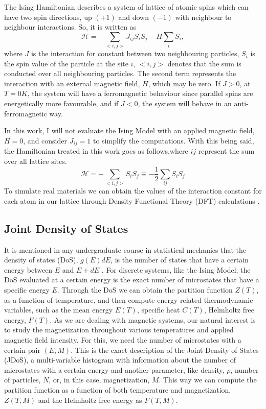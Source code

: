 The Ising Hamiltonian describes a system of lattice of atomic spins which can have two spin directions, up $(+1)$ and down $(-1)$ with neighbour to neighbour interactions. So, it is written as
\begin{equation}
	\mathcal{H} = -\sum_{<i,j>} J_{ij} S_i S_j - H \sum_iS_i,
\end{equation}
where $J$ is the interaction for constant between two neighbouring particles, $S_i$ is the spin value of the particle at the site $i$, $<i,j>$ denotes that the sum is conducted over all neighbouring particles. The second term represents the interaction with an external magnetic field, $H$, which may be zero. If $J>0$, at $T=0K$, the system will have a ferromagnetic behaviour since parallel spins are energetically more favourable, and if $J<0$, the system will behave in an anti-ferromagnetic way.

In this work, I will not evaluate the Ising Model with an applied magnetic field, $H=0$, and consider $J_{ij}=1$ to simplify the computations. With this being said, the Hamiltonian treated in this work goes as follows,where $ij$ represent the sum over all lattice sites. 
\begin{equation}
	\mathcal{H} = -\sum_{<i,j>} S_i  S_j \equiv -\frac{1}{2} \sum_{ij} S_i S_j
\end{equation}
	To simulate real materials we can obtain the values of the interaction constant for each atom in our lattice through Density Functional Theory (DFT) calculations \cite{DFT_book, Marzari2021}.

\subsection{Joint Density of States}

It is mentioned in any undergraduate course in statistical mechanics that the density of states (DoS), $g(E)dE$, is the number of states that have a certain energy between $E$ and $E+dE$ \cite{stat_mech}. For discrete systems, like the Ising Model, the DoS evaluated at a certain energy is the exact number of microstates that have a specific energy $E$. Through the DoS we can obtain the partition function $Z(T)$, as a function of temperature, and then compute energy related thermodynamic variables, such as the mean energy $E(T)$, specific heat $C(T)$, Helmholtz free energy, $F(T)$.  
As we are dealing with magnetic systems, our natural interest is to study the magnetization throughout various temperatures and applied magnetic field intensity. For this, we need the number of microstates with a certain pair $(E,M)$. This is the exact description of the Joint Density of States (JDoS), a multi-variable histogram with information about the number of microstates with a certain energy and another parameter, like density, $\rho$, number of particles, $N$, or, in this case, magnetization, $M$. This way we can compute the partition function as a function of both temperature and magnetization, $Z(T,M)$ and the Helmholtz free energy as $F(T,M)$.

